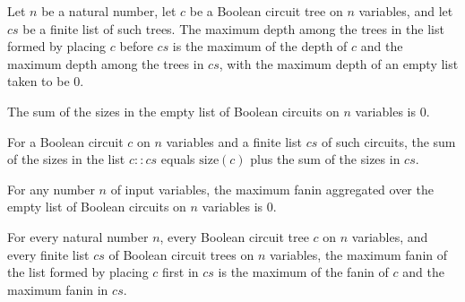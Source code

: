 \begin{theorem}
\label{BoolCircuit.TreeCircuit.maxDepth_cons}
\leanok
{}
Let $n$ be a natural number, let $c$ be a Boolean circuit tree on $n$ variables, and let
$cs$ be a finite list of such trees. The maximum depth among the trees in the list
formed by placing $c$ before $cs$ is the maximum of the depth of $c$ and the maximum
depth among the trees in $cs$, with the maximum depth of an empty list taken to be $0$.
\end{theorem}

\begin{theorem}
\label{BoolCircuit.TreeCircuit.sumSize_nil}
\leanok
{}
The sum of the sizes in the empty list of Boolean circuits on $n$ variables is $0$.
\end{theorem}

\begin{theorem}
\label{BoolCircuit.TreeCircuit.sumSize_cons}
\leanok
{}
For a Boolean circuit $c$ on $n$ variables and a finite list $cs$ of such circuits, the
sum of the sizes in the list $c::cs$ equals $\mathrm{size}(c)$ plus the sum of the sizes
in $cs$.
\end{theorem}

\begin{theorem}
\label{BoolCircuit.TreeCircuit.maxFaninL_nil}
\leanok
{}
For any number $n$ of input variables, the maximum fanin aggregated over the empty list
of Boolean circuits on $n$ variables is $0$.
\end{theorem}

\begin{theorem}
\label{BoolCircuit.TreeCircuit.maxFaninL_cons}
\leanok
{}
For every natural number $n$, every Boolean circuit tree $c$ on $n$ variables, and every
finite list $cs$ of Boolean circuit trees on $n$ variables, the maximum fanin of the
list formed by placing $c$ first in $cs$ is the maximum of the fanin of $c$ and the
maximum fanin in $cs$.
\end{theorem}

